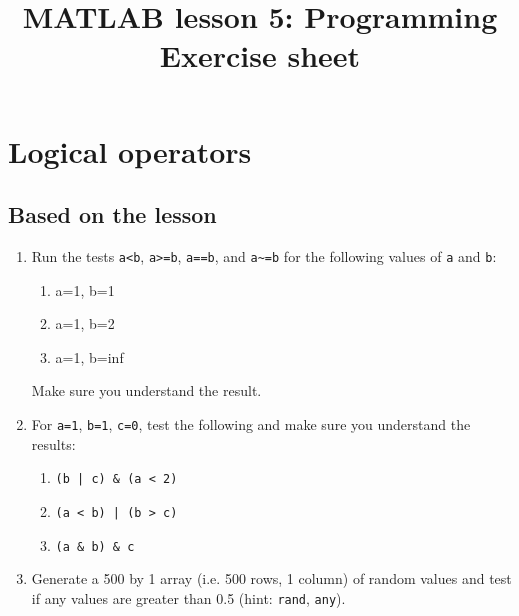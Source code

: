 \documentclass{article}
\title{MATLAB lesson 5: Programming\\Exercise sheet}
\date{}
\author{} %
\begin{document}
	\maketitle
	
	\section{Logical operators}
	\subsection*{Based on the lesson}
	\begin{enumerate}
		\item Run the tests \texttt{a<b}, \texttt{a>=b}, \texttt{a==b}, and \texttt{a\textasciitilde=b} for the following values of \texttt{a} and \texttt{b}:
		
		\begin{enumerate}
			\item a=1, b=1
			\item a=1, b=2
			\item a=1, b=inf
		\end{enumerate}
		Make sure you understand the result.
		\item For \texttt{a=1}, \texttt{b=1}, \texttt{c=0}, test the following and make sure you understand the results:
		\begin{enumerate}
			\item \texttt{(b | c) \& (a < 2)}
			\item \texttt{(a < b) | (b > c)}
			\item \texttt{(a \& b) \& c}
		\end{enumerate}	
		\item Generate a 500 by 1 array (i.e. 500 rows, 1 column) of random values and test if any values are greater than 0.5 (hint: \texttt{rand}, \texttt{any}).
	\end{enumerate}	
\end{document}
